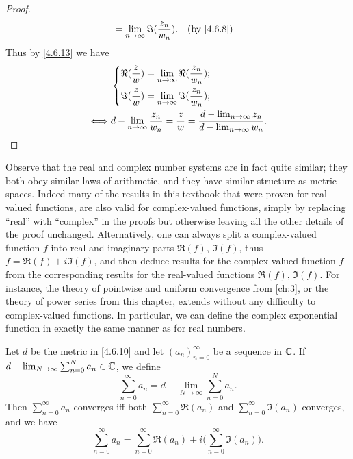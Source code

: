\begin{proof}
\begin{align*}
                      & = \lim_{n \to \infty} \Im(\dfrac{z_n}{w_n}).                                                                       &  & \by{4.6.8}
  \end{align*}
  Thus by \cref{4.6.13} we have
  \begin{align*}
         & \begin{dcases}
             \Re(\dfrac{z}{w}) = \lim_{n \to \infty} \Re(\dfrac{z_n}{w_n}); \\
             \Im(\dfrac{z}{w}) = \lim_{n \to \infty} \Im(\dfrac{z_n}{w_n});
           \end{dcases}                                                              \\
    \iff & d - \lim_{n \to \infty} \dfrac{z_n}{w_n} = \dfrac{z}{w} = \dfrac{d - \lim_{n \to \infty} z_n}{d - \lim_{n \to \infty} w_n}.
  \end{align*}
\end{proof}

\begin{note}
  Observe that the real and complex number systems are in fact quite similar;
  they both obey similar laws of arithmetic, and they have similar structure as metric spaces.
  Indeed many of the results in this textbook that were proven for real-valued functions, are also valid for complex-valued functions, simply by replacing ``real'' with ``complex'' in the proofs but otherwise leaving all the other details of the proof unchanged.
  Alternatively, one can always split a complex-valued function \(f\) into real and imaginary parts \(\Re(f)\), \(\Im(f)\), thus \(f = \Re(f) + i \Im(f)\), and then deduce results for the complex-valued function \(f\) from the corresponding results for the real-valued functions \(\Re(f)\), \(\Im(f)\).
  For instance, the theory of pointwise and uniform convergence from \cref{ch:3}, or the theory of power series from this chapter, extends without any difficulty to complex-valued functions.
  In particular, we can define the complex exponential function in exactly the same manner as for real numbers.
\end{note}

\begin{ac}\label{ac:4.6.6}
  Let \(d\) be the metric in \cref{4.6.10} and let \((a_n)_{n = 0}^\infty\) be a sequence in \(\mathbb{C}\).
  If \(d - \lim_{N \to \infty} \sum_{n = 0}^N a_n \in \mathbb{C}\), we define
  \[
    \sum_{n = 0}^\infty a_n = d - \lim_{N \to \infty} \sum_{n = 0}^N a_n.
  \]
  Then \(\sum_{n = 0}^\infty a_n\) converges iff both \(\sum_{n = 0}^\infty \Re(a_n)\) and \(\sum_{n = 0}^\infty \Im(a_n)\) converges, and we have
  \[
    \sum_{n = 0}^\infty a_n = \sum_{n = 0}^\infty \Re(a_n) + i \bigg(\sum_{n = 0}^\infty \Im(a_n)\bigg).
  \]
\end{ac}

